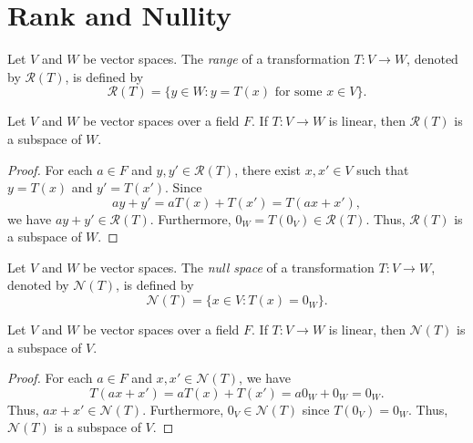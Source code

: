 \section{Rank and Nullity}
\begin{definition}
  \label{def:range}
  Let $V$ and $W$ be vector spaces.
  The \emph{range} of a transformation $T: V \to W$, denoted by
  $\mathcal{R}(T)$, is defined by
  \begin{equation*}
    \mathcal{R}(T) = \{y \in W : \text{$y = T(x)$ for some $x \in V$}\}.
  \end{equation*}
\end{definition}

\begin{proposition}
  \label{prop:range}
  Let $V$ and $W$ be vector spaces over a field $F$.
  If $T: V \to W$ is linear, then $\mathcal{R}(T)$ is a subspace of $W$.
\end{proposition}
\begin{proof}
  For each $a \in F$ and $y, y' \in \mathcal{R}(T)$, there exist $x, x' \in V$
  such that $y = T(x)$ and $y' = T(x')$.
  Since
  \begin{equation*}
    ay + y' = aT(x) + T(x') = T(ax + x'),
  \end{equation*}
  we have $ay + y' \in \mathcal{R}(T)$.
  Furthermore, $0_W = T(0_V) \in \mathcal{R}(T)$.
  Thus, $\mathcal{R}(T)$ is a subspace of $W$.
\end{proof}

\begin{definition}
  \label{def:null-space}
  Let $V$ and $W$ be vector spaces.
  The \emph{null space} of a transformation $T: V \to W$, denoted by
  $\mathcal{N}(T)$, is defined by
  \begin{equation*}
    \mathcal{N}(T) = \{x \in V : T(x) = 0_W\}.
  \end{equation*}
\end{definition}

\begin{proposition}
  \label{prop:null-space}
  Let $V$ and $W$ be vector spaces over a field $F$.
  If $T: V \to W$ is linear, then $\mathcal{N}(T)$ is a subspace of $V$.
\end{proposition}
\begin{proof}
  \label{prop:null-space}
  For each $a \in F$ and $x, x' \in \mathcal{N}(T)$, we have
  \begin{equation*}
    T(ax + x') = aT(x) + T(x') = a0_W + 0_W = 0_W.
  \end{equation*}
  Thus, $ax + x' \in \mathcal{N}(T)$.
  Furthermore, $0_V \in \mathcal{N}(T)$ since $T(0_V) = 0_W$.
  Thus, $\mathcal{N}(T)$ is a subspace of $V$.
\end{proof}

